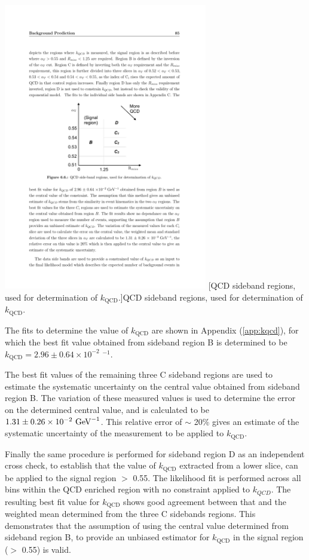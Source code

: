 \begin{minipage}{\linewidth}
\centering
\includegraphics[width = 3.5in]{plots/qcd_cartoon.pdf}
[QCD sideband regions, used for determination of $k_{\text{QCD}}$.]{QCD sideband regions, used for determination of $k_{\text{QCD}}$.}
\label{fig:qcdcartoon}
\end{minipage}

The fits to determine the value of $k_{\text{QCD}}$ are shown in Appendix (\ref{app:kqcd}), for which the best fit value obtained from sideband region B is determined to be $k_{\text{QCD}} = 2.96 \pm 0.64 \times 10^{-2}$ \GeV$^{-1}$. 

The best fit values of the remaining three C sideband regions are used to estimate the systematic uncertainty on the central value obtained from sideband region B. The variation of these measured values is used to determine the error on the determined central value, and is calculated to be $1.31 \pm 0.26 \times 10^{-2} \text{ GeV}^{-1}$. This relative error of $\sim$ 20\% gives an estimate of the systematic uncertainty of the measurement to be applied to $k_{\text{QCD}}$.

Finally the same procedure is performed for sideband region D as an independent cross check, to establish that the value of $k_{\text{QCD}}$ extracted from a lower \alphat slice, can be applied to the signal region \alphat $>$ 0.55. The likelihood fit is performed across all \theht bins within the QCD enriched region with no constraint applied to $k_{QCD}$. The resulting best fit value for $k_{\text{QCD}}$ shows good agreement between that and the weighted mean determined from the three C sidebands regions. This demonstrates that the assumption of using the central value determined from sideband region B, to provide an unbiased estimator for $k_{\text{QCD}}$ in the signal region (\alphat $>$ 0.55) is valid.

